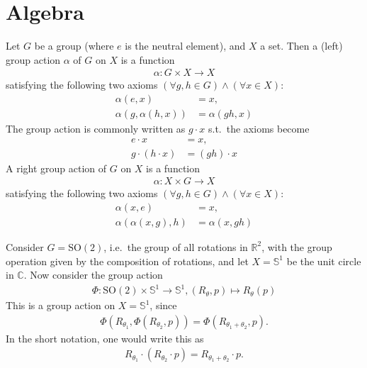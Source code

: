 \section{Algebra}

\begin{defn}[Action]\label{defn:algebra__group_action}
	Let $G$ be a group (where $e$ is the neutral element), and $X$ a set. Then a (left) group action $\alpha$ of $G$ on $X$ is a function
	\begin{align}
		\alpha: G\times X \rightarrow X
	\end{align}
	satisfying the following two axioms $(\forall g, h\in G) \wedge (\forall x\in X)$:
	\begin{align*}
		\alpha(e, x) &= x, 
		\\ \alpha(g, \alpha(h, x)) &= \alpha(gh, x)
	\end{align*}
	The group action is commonly written as $g\cdot x$ s.t.~the axioms become
	\begin{align}\label{eqn:left__group_action}
		e\cdot x &= x, 
		\\ g\cdot \left(h\cdot x\right) &= \left(gh\right)\cdot x
	\end{align}
	A right group action of $G$ on $X$ is a function
	\begin{align}
		\alpha: X\times G \rightarrow X
	\end{align}
	satisfying the following two axioms $(\forall g, h\in G) \wedge (\forall x\in X)$:
	\begin{align}
		\alpha(x, e) &= x, 
		\\ \alpha(\alpha(x, g), h) &= \alpha(x, gh)
	\end{align}
\end{defn}

\begin{exmp}
	Consider $G = \text{SO}(2)$, i.e.~the group of all rotations in $\mathbb R^2$, with the group operation given by the composition of rotations, and let $X = \mathbb S^1$ be the unit circle in $\mathbb C$. Now consider the group action
	\begin{align}
		\Phi:\text{SO}(2) \times \mathbb S^{1} \rightarrow \mathbb S^{1}, (R_{\theta}, p) \mapsto R_{\theta}(p)
	\end{align}
	This is a group action on $X = \mathbb S^{1}$, since 
	\begin{align*}
		\Phi(R_{\theta_1}, \Phi(R_{\theta_2}, p)) = \Phi(R_{\theta_1 + \theta_2}, p).
	\end{align*}
	In the short notation, one would write this as
	\begin{align*}
		R_{\theta_1}\cdot \left( R_{\theta_2} \cdot p \right) = R_{\theta_1 + \theta_2} \cdot p.
	\end{align*}
\end{exmp}

